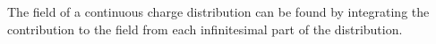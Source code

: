 The field of a continuous charge distribution can be found by integrating the contribution
to the field from each infinitesimal part of the distribution.
